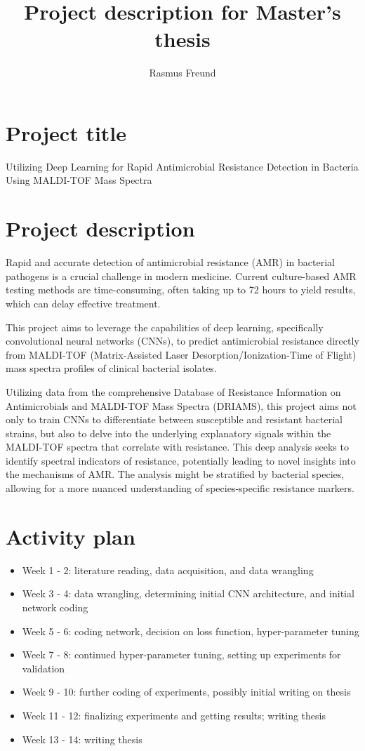 \documentclass[english,12pt,a4paper,notitlepage]{report}
\title{Project description for Master's thesis}
\author{Rasmus Freund}
\begin{document}
	\maketitle
	
	\section*{Project title}
	Utilizing Deep Learning for Rapid Antimicrobial Resistance Detection in Bacteria Using MALDI-TOF Mass Spectra
	
	\section*{Project description}
	Rapid and accurate detection of antimicrobial resistance (AMR) in bacterial pathogens is a crucial challenge in modern medicine. Current culture-based AMR testing methods are time-consuming, often taking up to 72 hours to yield results, which can delay effective treatment.
	
	This project aims to leverage the capabilities of deep learning, specifically convolutional neural networks (CNNs), to predict antimicrobial resistance directly from MALDI-TOF (Matrix-Assisted Laser Desorption/Ionization-Time of Flight) mass spectra profiles of clinical bacterial isolates. 
	
	Utilizing data from the comprehensive Database of Resistance Information on Antimicrobials and MALDI-TOF Mass Spectra (DRIAMS), this project aims not only to train CNNs to differentiate between susceptible and resistant bacterial strains, but also to delve into the underlying explanatory signals within the MALDI-TOF spectra that correlate with resistance. This deep analysis seeks to identify spectral indicators of resistance, potentially leading to novel insights into the mechanisms of AMR. The analysis might be stratified by bacterial species, allowing for a more nuanced understanding of species-specific resistance markers.
	\newpage
	
	\section*{Activity plan}
	\begin{itemize}
		\item Week 1 - 2: literature reading, data acquisition, and data wrangling
		\item Week 3 - 4: data wrangling, determining initial CNN architecture, and initial network coding
		\item Week 5 - 6: coding network, decision on loss function, hyper-parameter tuning
		\item Week 7 - 8: continued hyper-parameter tuning, setting up experiments for validation
		\item Week 9 - 10: further coding of experiments, possibly initial writing on thesis
		\item Week 11 - 12: finalizing experiments and getting results; writing thesis
		\item Week 13 - 14: writing thesis
	\end{itemize}
	
\end{document}
